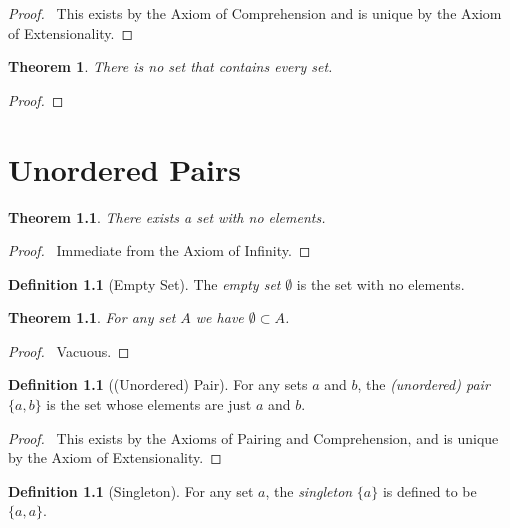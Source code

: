 \documentclass{report}
\let\qed\relax
\newtheorem{thm}[ax]{Theorem}
\theoremstyle{definition}
\newtheorem{df}[ax]{Definition}
\begin{document}
\begin{proof}
\pf\ This exists by the Axiom of Comprehension and is unique by the Axiom of Extensionality. \qed
\end{proof}

\begin{thm}
There is no set that contains every set.
\end{thm}

\begin{proof}
\pf
{}
\qed
\end{proof}

\chapter{Unordered Pairs}

\begin{thm}
There exists a set with no elements.
\end{thm}

\begin{proof}
\pf\ Immediate from the Axiom of Infinity. \qed
\end{proof}

\begin{df}[Empty Set]
The \emph{empty set} $\emptyset$ is the set with no elements.
\end{df}

\begin{thm}
For any set $A$ we have $\emptyset \subset A$.
\end{thm}

\begin{proof}
\pf\ Vacuous. \qed
\end{proof}

\begin{df}[(Unordered) Pair]
For any sets $a$ and $b$, the \emph{(unordered) pair} $\{a,b\}$ is the set whose elements are just $a$ and $b$.
\end{df}

\begin{proof}
\pf\ This exists by the Axioms of Pairing and Comprehension, and is unique by the Axiom of Extensionality. \qed
\end{proof}

\begin{df}[Singleton]
For any set $a$, the \emph{singleton} $\{a\}$ is defined to be $\{a,a\}$.
\end{df}
\end{document}

